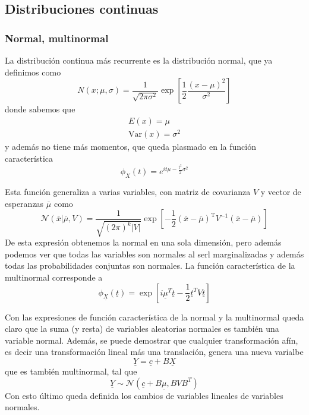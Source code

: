 \documentclass{article}
\numberwithin{equation}{section} %
\begin{document}
\subsection{Distribuciones continuas}
\subsubsection{Normal, multinormal}
La distribución continua más recurrente es la distribución normal, que ya definimos como
\begin{equation}
N(x;\mu,\sigma) = \frac{1}{\sqrt{2 \pi \sigma^2}} \exp\left[\frac{1}{2} \frac{(x - \mu)^2}{\sigma^2}\right]
\end{equation}
donde sabemos que
\begin{equation}
\begin{gathered}
E(x) = \mu \\
\text{Var}(x) = \sigma^2
\end{gathered}
\end{equation}
y además no tiene más momentos, que queda plasmado en la función característica
\begin{equation}
\phi_{X}(t) = e^{i t \mu - \frac{t^2}{2} \sigma^2}
\end{equation}

Esta función generaliza a varias variables, con matriz de covarianza $V$ y vector de esperanzas $\overline{\mu}$ como
\begin{equation}
\mathcal{N}(\overline{x}|\overline{\mu}, V) = \frac{1}{\sqrt{(2\pi)^{k}|V|}}
\exp\left[-\frac{1}{2}(\overline{x}-\overline{\mu})^\mathrm{T} V^{-1} (\overline{x}-\overline{\mu})\right]
\end{equation}
De esta expresión obtenemos la normal en una sola dimensión, pero además podemos ver que todas las variables son normales al serl marginalizadas y además todas las probabilidades conjuntas son normales. La función característica de la multinormal corresponde a
\begin{equation}
\phi_{\underline{X}}(\underline{t}) = \exp\left[i \underline{\mu}^{T} \underline{t} - \frac{1}{2} \underline{t}^T V \underline{t}\right]
\end{equation}

Con las expresiones de función característica de la normal y la multinormal queda claro que la suma (y resta) de variables aleatorias normales es también una variable normal. Además, se puede demostrar que cualquier transformación afín, es decir una transformación lineal más una translación, genera una nueva varialbe
\begin{equation}
\underline{Y} = \underline{c} + B \underline{X}
\end{equation}
que es también multinormal, tal que
\begin{equation}
\underline{Y} \sim \mathcal{N}(\underline{c} + B \underline{\mu}, B V B^{T})
\end{equation}
Con esto último queda definida los cambios de variables lineales de variables normales.
\end{document}
